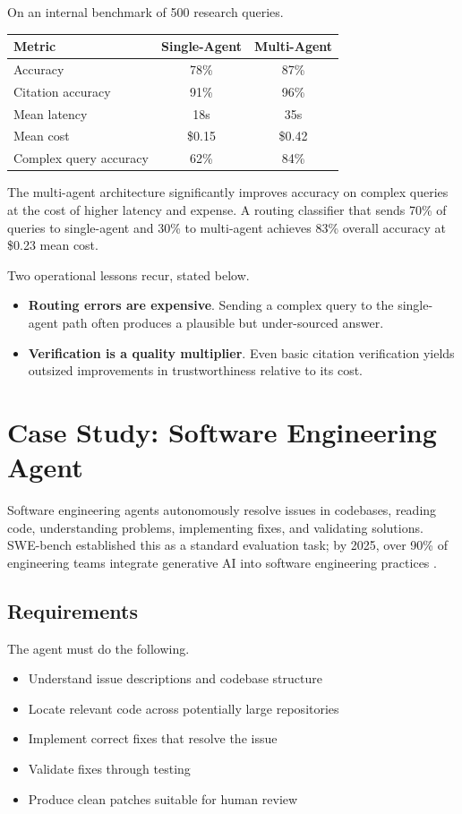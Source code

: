 On an internal benchmark of 500 research queries.

\begin{center}
\begin{tabular}{lcc}
\toprule
Metric & Single-Agent & Multi-Agent \\
\midrule
Accuracy & 78\% & 87\% \\
Citation accuracy & 91\% & 96\% \\
Mean latency & 18s & 35s \\
Mean cost & \$0.15 & \$0.42 \\
Complex query accuracy & 62\% & 84\% \\
\bottomrule
\end{tabular}
\end{center}

The multi-agent architecture significantly improves accuracy on complex queries at the cost of higher latency and expense. A routing classifier that sends 70\% of queries to single-agent and 30\% to multi-agent achieves 83\% overall accuracy at \$0.23 mean cost.

Two operational lessons recur, stated below.
\begin{itemize}
\item \textbf{Routing errors are expensive}. Sending a complex query to the single-agent path often produces a plausible but under-sourced answer.
\item \textbf{Verification is a quality multiplier}. Even basic citation verification yields outsized improvements in trustworthiness relative to its cost.
\end{itemize}

\section{Case Study: Software Engineering Agent}

Software engineering agents autonomously resolve issues in codebases, reading code, understanding problems, implementing fixes, and validating solutions. SWE-bench \cite{swebench2024} established this as a standard evaluation task; by 2025, over 90\% of engineering teams integrate generative AI into software engineering practices \cite{sweevo2025}.

\subsection{Requirements}

The agent must do the following.
\begin{itemize}
\item Understand issue descriptions and codebase structure
\item Locate relevant code across potentially large repositories
\item Implement correct fixes that resolve the issue
\item Validate fixes through testing
\item Produce clean patches suitable for human review
\end{itemize}


